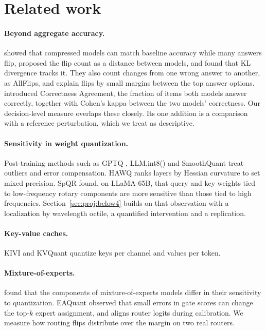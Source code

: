 \documentclass[journal]{IEEEtran}
\begin{document}
\section{Related work}\label{sec:related}

\paragraph{Beyond aggregate accuracy.} \citet{dutta2024accuracy} showed that compressed models
can match baseline accuracy while many answers flip, proposed the flip count as a distance
between models, and found that KL divergence tracks it. They also count changes from one wrong
answer to another, as AllFlips, and explain flips by small margins between the top answer
options. \citet{rababah2026illusion} introduced Correctness Agreement, the fraction of items
both models answer correctly, together with Cohen's kappa between the two models'
correctness. Our decision-level measure overlaps these closely. Its one addition is a
comparison with a reference perturbation, which we treat as descriptive.

\paragraph{Sensitivity in weight quantization.} Post-training methods such as GPTQ
\citep{frantar2023gptq}, LLM.int8() \citep{dettmers2022llmint8} and SmoothQuant
\citep{xiao2023smoothquant} treat outliers and error compensation. HAWQ
\citep{dong2019hawq,dong2020hawqv2} ranks layers by Hessian curvature to set mixed precision.
SpQR \citep{dettmers2024spqr} found, on LLaMA-65B, that query and key weights tied to
low-frequency rotary components \citep{su2024roformer} are more sensitive than those tied to
high frequencies. Section~\ref{sec:proj:below4} builds on that observation with a localization
by wavelength octile, a quantified intervention and a replication.

\paragraph{Key-value caches.} KIVI \citep{liu2024kivi} and KVQuant \citep{hooper2024kvquant}
quantize keys per channel and values per token.

\paragraph{Mixture-of-experts.} \citet{li2024quantmoebench} found that the components of
mixture-of-experts models differ in their sensitivity to quantization. EAQuant
\citep{fu2025eaquant} observed that small errors in gate scores can change the top-$k$ expert
assignment, and aligns router logits during calibration. We measure how routing flips
distribute over the margin on two real routers.
\end{document}
